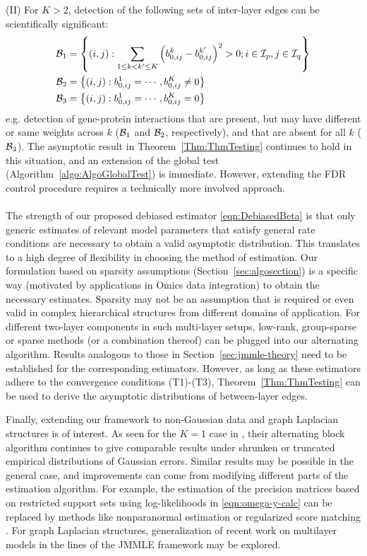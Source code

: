 \noindent (II) For $K > 2$, detection of the following sets of inter-layer edges can be scientifically significant:
%
\begin{align*}
{\cal{B}}_1 &= \left\{ (i,j): \sum_{1 \leq k < k' \leq K} \left(b_{0,ij}^k - b_{0,ij}^{k'} \right)^2 > 0; i \in {\cal{I}}_p, j \in {\cal{I}}_q \right\}\\
{\cal{B}}_2 &= \left\{ (i,j): b_{0,ij}^1 = \cdots, b_{0,ij}^K \neq 0 \right\}\\
{\cal{B}}_3 &= \left\{ (i,j): b_{0,ij}^1 = \cdots, b_{0,ij}^K = 0 \right\}
\end{align*}
%
e.g. detection of gene-protein interactions that are present, but may have different or same weights across $k$ (${\cal{B}}_1$ and ${\cal{B}}_2$, respectively), and that are absent for all $k$ (${\cal{B}}_3$). The asymptotic result in Theorem~\ref{Thm:ThmTesting} continues to hold in this situation, and an extension of the global test (Algorithm~\ref{algo:AlgoGlobalTest}) is immediate. However, extending the FDR control procedure requires a technically more involved approach.

\paragraph*{}
The strength of our proposed debiased estimator \eqref{eqn:DebiasedBeta} is that only generic estimates of relevant model parameters that satisfy general rate conditions are necessary to obtain a valid asymptotic distribution. This translates to a high degree of flexibility in choosing the method of estimation. Our formulation based on sparsity assumptions (Section~\ref{sec:algosection}) is a specific way (motivated by applications in Omics data integration) to obtain the necessary estimates. Sparsity may not be an assumption that is required or even valid in complex hierarchical structures from different domains of application. For different two-layer components in such multi-layer setups, low-rank, group-sparse or sparse methods (or a combination thereof) can be plugged into our alternating algorithm. Results analogous to those in Section~\ref{sec:jmmle-theory} need to be established for the corresponding estimators. However, as long as these estimators adhere to the convergence conditions (T1)-(T3), Theorem~\ref{Thm:ThmTesting} can be used to derive the asymptotic distributions of between-layer edges.

Finally, extending our framework to non-Gaussian data and {\colb graph Laplacian structures} is of interest. As seen for the $K=1$ case in \citet{LinEtal16}, their alternating block algorithm continues to give comparable results under shrunken or truncated empirical distributions of Gaussian errors. Similar results may be possible in the general case, and improvements can come from modifying different parts of the estimation algorithm. For example, the estimation of the precision matrices based on restricted support sets using log-likelihoods in \eqref{eqn:omega-y-calc} can be replaced by methods like nonparanormal estimation \citep{LiuLaffertyWasserman09} or regularized score matching \citep{LinDrtonShojaie16}. {\colb For graph Laplacian structures, generalization of recent work on multilayer models \citep{BayramEtal20,KumarEtal20} in the lines of the JMMLE framework may be explored.}